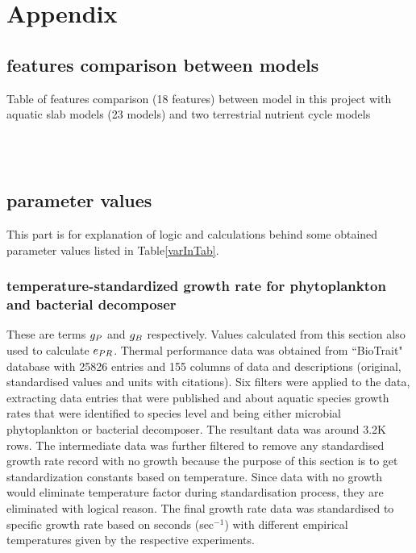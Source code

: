 \documentclass[../thesis.tex]{subfiles} %
\begin{document}
\section{Appendix}
\beginSupp

\subsection{features comparison between models}
\begin{table}[H]
\begin{tiny}
    \centering
    \caption[Model features comparison]{Table of features comparison (18 features) between model in this project with aquatic slab models (23 models) and two terrestrial nutrient cycle models}
    \\
    \vspace{.5cm}
    \\
    \vspace{.5cm}
    \label{modComp}
\end{tiny}
\end{table}

\subsection{parameter values}
This part is for explanation of logic and calculations behind some obtained parameter values listed in Table\ref{varInTab}.

\subsubsection{temperature-standardized growth rate for phytoplankton and bacterial decomposer}
These are terms $g_P$ and $g_B$ respectively.  Values calculated from this section also used to calculate $e_{PR}$.  Thermal performance data was obtained from ``BioTrait" database\autocite{della2013thermal} with 25826 entries and 155 columns of data and descriptions (original, standardised values and units with citations).  Six filters were applied to the data, extracting data entries that were published and about aquatic species growth rates that were identified to species level and being either microbial phytoplankton or bacterial decomposer.  The resultant data was around 3.2K rows.  The intermediate data was further filtered to remove any standardised growth rate record with no growth because the purpose of this section is to get standardization constants based on temperature.  Since data with no growth would eliminate temperature factor during standardisation process, they are eliminated with logical reason.  The final growth rate data was standardised to specific growth rate based on seconds (sec$^{-1}$) with different empirical temperatures given by the respective experiments.
\end{document}
